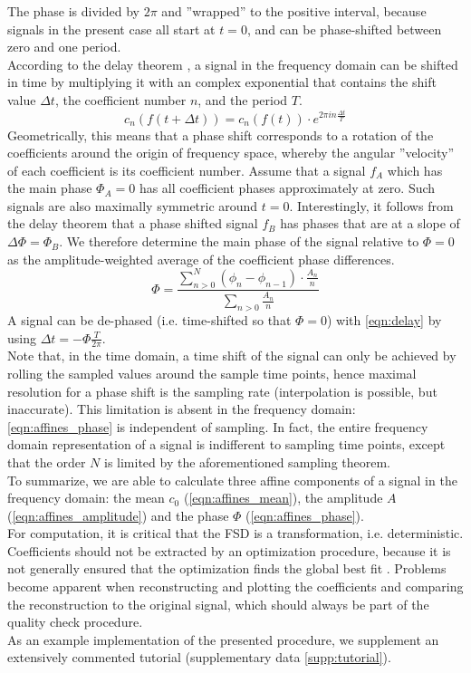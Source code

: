 \documentclass[9pt,twoside,lineno]{pnas-new}
\begin{document}
The phase is divided by $2\pi$ and ''wrapped'' to the positive interval, because signals in the present case all start at $t=0$, and can be phase-shifted between zero and one period. 
\\According to the delay theorem \cite[also shift theorem,][p. 111]{Bracewell2000}, a signal in the frequency domain can be shifted in time by multiplying it with an complex exponential that contains the shift value $\Delta t$, the coefficient number $n$, and the period $T$. 
\begin{equation}\label{eqn:delay}
  c_{n}\left( f(t+\Delta t)\right) = c_{n}\left( f(t)\right)\cdot e^{2\pi i n \frac{\Delta t}{T}}
\end{equation}
Geometrically, this means that a phase shift corresponds to a rotation of the coefficients around the origin of frequency space, whereby the angular ''velocity'' of each coefficient is its coefficient number. 
Assume that a signal $f_{A}$ which has the main phase $\Phi_{A} = 0$ has all coefficient phases approximately at zero. 
Such signals are also maximally symmetric around $t=0$. 
Interestingly, it follows from the delay theorem that a phase shifted signal $f_{B}$ has phases that are at a slope of $\Delta \Phi = \Phi_{B}$. 
We therefore determine the main phase of the signal relative to $\Phi=0$ as the amplitude-weighted average of the coefficient phase differences. 
	\begin{equation}\label{eqn:affines_phase}
	\Phi = \frac{\sum_{n>0}^{N} (\phi_{n}-\phi_{n-1})\cdot \frac{A_{n}}{n}}{\sum_{n>0} \frac{A_{n}}{n}}
	\end{equation}
A signal can be de-phased (i.e. time-shifted so that $\Phi=0$) with \eqref{eqn:delay} by using $\Delta t = -\Phi \frac{T}{2\pi}$. 
\\Note that, in the time domain, a time shift of the signal can only be achieved by rolling the sampled values around the sample time points, hence maximal resolution for a phase shift is the sampling rate (interpolation is possible, but inaccurate). 
This limitation is absent in the frequency domain: \eqref{eqn:affines_phase} is independent of sampling. 
In fact, the entire frequency domain representation of a signal is indifferent to sampling time points, except that the order $N$ is limited by the aforementioned sampling theorem. 
\\To summarize, we are able to calculate three affine components of a signal in the frequency domain: the mean $c_{0}$ (\eqref{eqn:affines_mean}), the amplitude $A$ (\eqref{eqn:affines_amplitude}) and the phase $\Phi$ (\eqref{eqn:affines_phase}). 
\bigskip\\For computation, it is critical that the FSD is a transformation, i.e. deterministic. 
Coefficients should not be extracted by an optimization procedure, because it is not generally ensured that the optimization finds the global best fit \cite{Hubel2015,Basu2019}. 
Problems become apparent when reconstructing and plotting the coefficients and comparing the reconstruction to the original signal, which should always be part of the quality check procedure. 
\\ As an example implementation of the presented procedure, we supplement an extensively commented tutorial (supplementary data \ref*{supp:tutorial}). 
\end{document}
